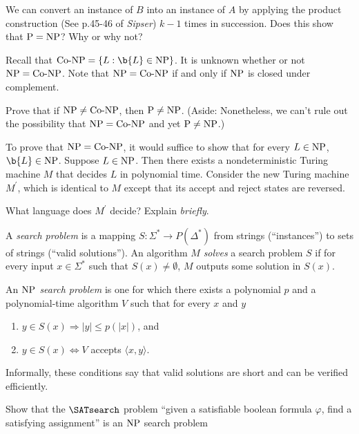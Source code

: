 \documentclass[ps, letterpaper]{cs121}
\begin{document}
\subproblem We can convert an instance of $B$ into an instance of $A$ by applying the product construction (See p.45-46 of {\em Sipser}) $k-1$ times in succession. Does this show that $\mathrm{P}=\mathrm{NP}$? Why or why not?

\pagebreak

Recall that $\CoNP = \{ L: \b{L} \in \NP \}$.  It is unknown whether or not $\mathrm{NP} = \mathrm{\text{Co-}NP}$. Note that $\mathrm{NP} = \mathrm{\text{Co-}NP}$ if and only if $\mathrm{NP}$ is closed under complement.

\subproblem
Prove that if $\mathrm{NP} \neq \mathrm{\text{Co-}NP}$, then $\mathrm{P} \neq \mathrm{NP}$. (Aside: Nonetheless, we can't rule out the possibility that $\mathrm{NP} = \mathrm{\text{Co-}NP}$ and yet $\mathrm{P} \neq \mathrm{NP}$.)

\subproblem
To prove that $\mathrm{NP} = \mathrm{\text{Co-}NP}$, it would suffice to show that for every $L \in \mathrm{NP}$, $\b{L} \in \NP$.  Suppose $L \in \mathrm{NP}$.  Then there exists a nondeterministic Turing machine $M$ that decides $L$ in polynomial time.  Consider the new Turing machine $M^\prime$, which is identical to $M$ except that its accept and  reject states are reversed.

What language does $M^\prime$ decide?  Explain \emph{briefly}.



A {\em search problem} is a mapping $S : \Sigma^* \rightarrow P(\Delta^*)$ from strings (``instances'') to sets of strings (``valid solutions''). An algorithm $M$ {\em solves} a search problem $S$ if for every input $x\in \Sigma^*$ such that $S(x)\neq \emptyset$, $M$ outputs some solution in $S(x)$.

An {\em $\mathrm{NP}$ search problem} is one for which there exists a polynomial $p$ and a polynomial-time algorithm $V$ such that for every $x$ and $y$

\begin{enumerate}\addtolength{\itemsep}{-0.3\baselineskip} 
\item $y\in S(x) \Rightarrow |y|\leq p(|x|)$, and 
\item $y\in S(x) \Leftrightarrow V$ accepts $\langle x,y\rangle$.
\end{enumerate}

Informally, these conditions say that valid solutions are short and can be verified efficiently.

\subproblem Show that the $\SATsearch$ problem ``given a satisfiable boolean formula $\varphi$, find a satisfying assignment'' is an $\mathrm{NP}$ search problem
\end{document}
